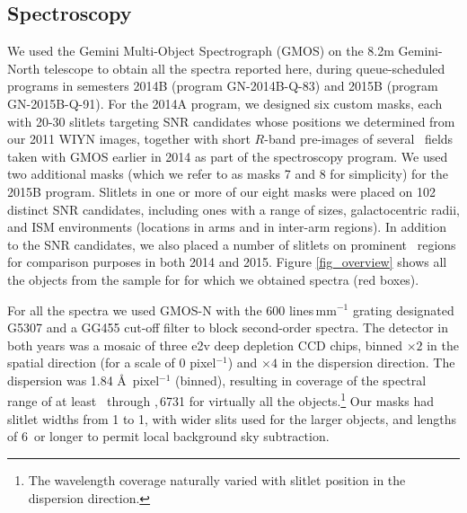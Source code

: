 \subsection{Spectroscopy}


We used the Gemini Multi-Object Spectrograph (GMOS) on the 8.2m Gemini-North telescope to obtain all the spectra reported here, during queue-scheduled programs in semesters 2014B (program GN-2014B-Q-83) and 2015B (program GN-2015B-Q-91).  %
For the 2014A program, we designed six custom masks, each with 20-30 slitlets targeting SNR candidates whose positions we determined from our 2011 WIYN images, together with  short $R$-band pre-images of several \gal\ fields taken with GMOS earlier in 2014 as part of the spectroscopy program.    
We used two additional masks (which we refer to as masks 7 and 8 for simplicity)  for the 2015B program.
 Slitlets in one or more of our eight masks were placed on 102 distinct SNR candidates, including ones with a range of sizes, galactocentric radii, and ISM environments (locations in arms and in 
 inter-arm regions).  In addition to the SNR candidates, we also placed a number of slitlets on prominent \hii\ regions  for comparison purposes in both 2014 and 2015.
Figure \ref{fig_overview} shows all the objects from the sample for for which we obtained spectra (red boxes).  %


For all the spectra we used GMOS-N with the 600 lines\,mm$^{-1}$ grating designated G5307 and a GG455 cut-off filter to block second-order spectra.   The detector in both years was a mosaic of three e2v deep depletion CCD chips, binned $\times 2$ in the spatial direction (for a scale of 0 pixel$^{-1}$) and $\times 4$ in the dispersion direction.  
The dispersion was 1.84 \AA\,  pixel$^{-1}$ (binned), resulting in coverage of the spectral range of at least \hb\ through \sii{},\,6731 for virtually all the objects.\footnote{The wavelength coverage naturally varied with slitlet position in the dispersion direction.}  Our  masks had  slitlet  widths from 1 to 1, with wider slits used for the larger objects, and lengths of 6\arcsec\ or longer to permit local background sky subtraction.   

